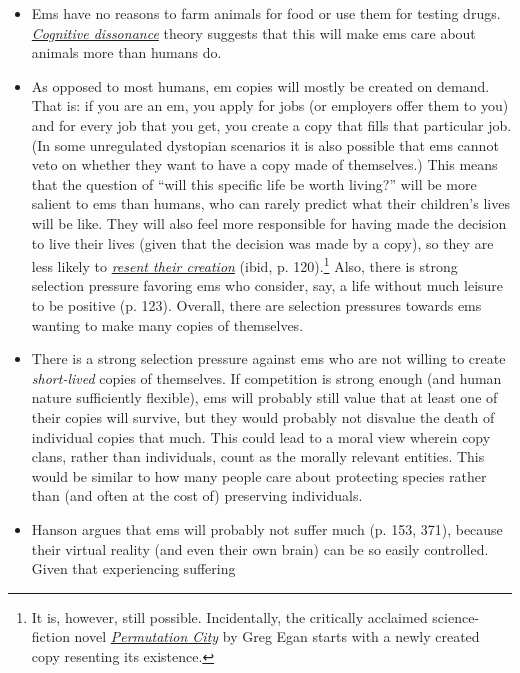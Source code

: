 \documentclass[]{article}
\begin{document}
\begin{itemize}
\item
  Ems have no reasons to farm animals for food or use them for testing
  drugs.
  \href{https://en.wikipedia.org/wiki/Cognitive_dissonance}{\emph{Cognitive
  dissonance}} theory suggests that this will make ems care about
  animals more than humans do.
\item
  As opposed to most humans, em copies will mostly be created on demand.
  That is: if you are an em, you apply for jobs (or employers offer them
  to you) and for every job that you get, you create a copy that fills
  that particular job. (In some unregulated dystopian scenarios it is
  also possible that ems cannot veto on whether they want to have a copy
  made of themselves.) This means that the question of ``will this
  specific life be worth living?'' will be more salient to ems than
  humans, who can rarely predict what their children's lives will be
  like. They will also feel more responsible for having made the
  decision to live their lives (given that the decision was made by a
  copy), so they are less likely to
  \href{https://en.wikipedia.org/wiki/Antinatalism}{\emph{resent their
  creation}} (ibid, p. 120).\footnote{It is, however, still possible.
    Incidentally, the critically acclaimed science-fiction novel
    \href{https://en.wikipedia.org/wiki/Permutation_City}{\emph{Permutation
    City}} by Greg Egan starts with a newly created copy resenting its
    existence.} Also, there is strong selection pressure favoring ems
  who consider, say, a life without much leisure to be positive (p.
  123). Overall, there are selection pressures towards ems wanting to
  make many copies of themselves.
\item
  There is a strong selection pressure against ems who are not willing
  to create \emph{short-lived} copies of themselves. If competition is
  strong enough (and human nature sufficiently flexible), ems will
  probably still value that at least one of their copies will survive,
  but they would probably not disvalue the death of individual copies
  that much. This could lead to a moral view wherein copy clans, rather
  than individuals, count as the morally relevant entities. This would
  be similar to how many people care about protecting species rather
  than (and often at the cost of) preserving individuals.
\item
  Hanson argues that ems will probably not suffer much (p. 153, 371),
  because their virtual reality (and even their own brain) can be so
  easily controlled. Given that experiencing suffering

\end{itemize}
\end{document}
